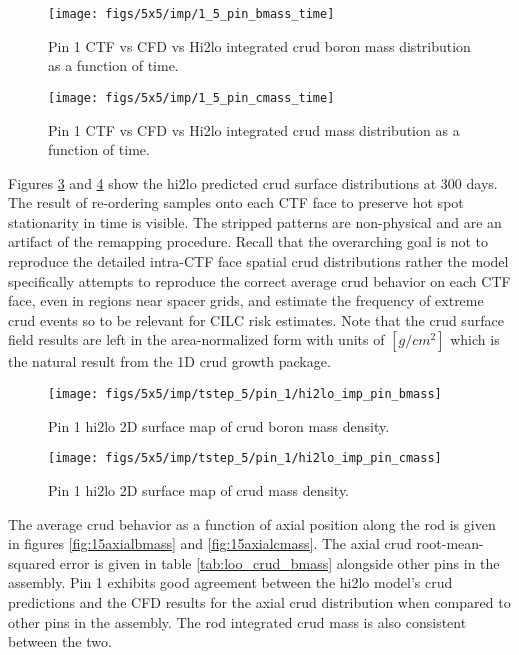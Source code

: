 \begin{figure}[H]
    \centering
    \texttt{[image: figs/5x5/imp/1\_5\_pin\_bmass\_time]}
    \caption{Pin 1 CTF vs CFD vs Hi2lo integrated crud boron mass distribution as a function of time.}
    \label{fig:15pinbmasstime}
\end{figure}
\begin{figure}[H]
    \centering
    \texttt{[image: figs/5x5/imp/1\_5\_pin\_cmass\_time]}
    \caption{Pin 1 CTF vs CFD vs Hi2lo integrated crud mass distribution as a function of time.}
    \label{fig:15pincmasstime}
\end{figure}

Figures \ref{fig:2d_hi2loimppinbmass} and \ref{fig:2d_hi2loimppincmass} show the hi2lo predicted crud surface distributions at 300 days.  The result of re-ordering samples onto each CTF face to preserve hot spot stationarity in time is visible.  The stripped patterns are non-physical and are an artifact of the remapping procedure.  Recall that the overarching goal is not to reproduce the detailed intra-CTF face spatial crud distributions rather the model specifically attempts to reproduce the correct average crud behavior on each CTF face, even in regions near spacer grids, and estimate the frequency of extreme crud events so to be relevant for CILC risk estimates.
Note that the crud surface field results are left in the area-normalized form with units of $[g/cm^2]$ which is the natural result from the 1D crud growth package.

\begin{figure}[H]
    \centering
    \texttt{[image: figs/5x5/imp/tstep\_5/pin\_1/hi2lo\_imp\_pin\_bmass]}
    \caption{Pin 1 hi2lo 2D surface map of crud boron mass density.}
    \label{fig:2d_hi2loimppinbmass}
\end{figure}
\begin{figure}[H]
    \centering
    \texttt{[image: figs/5x5/imp/tstep\_5/pin\_1/hi2lo\_imp\_pin\_cmass]}
    \caption{Pin 1 hi2lo 2D surface map of crud mass density.}
    \label{fig:2d_hi2loimppincmass}
\end{figure}

The average crud behavior as a function of axial position along the rod is given in figures \ref{fig:15axialbmass} and \ref{fig:15axialcmass}.  The axial crud root-mean-squared error is given in table \ref{tab:loo_crud_bmass} alongside other pins in the assembly.  Pin 1 exhibits good agreement between the hi2lo model's crud predictions and the CFD results for the axial crud distribution when compared to other pins in the assembly.  The rod integrated crud mass is also consistent between the two.

